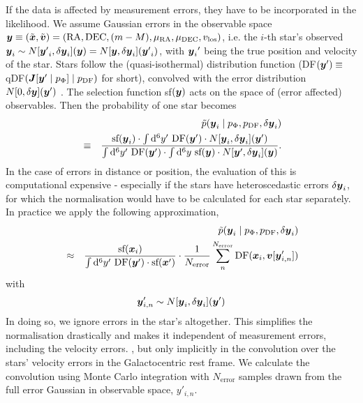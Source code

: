 
If the data is affected by measurement errors, they have to be incorporated in the likelihood. We assume Gaussian errors in the observable space $\boldsymbol{y} \equiv (\tilde{\boldsymbol{x}},\tilde{\boldsymbol{v}})=(\text{RA},\text{DEC},(m-M),\mu_\text{RA},\mu_\text{DEC},v_\text{los})$, i.e. the $i$-th star's observed $\boldsymbol{y}_i \sim N[{\boldsymbol{y}'}_i,\delta \boldsymbol{y}_i](\boldsymbol{y}) = N[\boldsymbol{y},\delta \boldsymbol{y}_i]({\boldsymbol{y}'}_i)$, with ${\boldsymbol{y}_i}'$ being the true position and velocity of the star. Stars follow the (quasi-isothermal) distribution function (DF$(\boldsymbol{y}') \equiv$ qDF$(\boldsymbol{J}[\boldsymbol{y}' \mid p_\Phi] \mid p_\text{DF})$ for short), convolved with the error distribution $N[0,\delta \boldsymbol{y}](\boldsymbol{y}')$ . The selection function sf$(\boldsymbol{y})$ acts on the space of (error affected) observables. 
Then the probability of one star becomes
\begin{eqnarray*}
&&\tilde{p}(\boldsymbol{y}_i \mid p_\Phi,p_\text{DF},\delta \boldsymbol{y}_i)\\
& \equiv& \frac{\text{sf}(\boldsymbol{y}_i) \cdot \int \mathop{}\!\mathrm{d^6} y' \  \text{DF}(\boldsymbol{y}') \cdot N[\boldsymbol{y}_i,\delta \boldsymbol{y}_i](\boldsymbol{y}')}{\int \mathop{}\!\mathrm{d^6}y'  \  \text{DF}(\boldsymbol{y}')  \cdot  \int \mathop{}\!\mathrm{d^6} y \  \text{sf}(\boldsymbol{y})  \cdot N[\boldsymbol{y}',\delta \boldsymbol{y}_i](\boldsymbol{y})}.
\end{eqnarray*}
In the case of errors in distance or position, the evaluation of this is computational expensive - especially if the stars have heteroscedastic errors $\delta \boldsymbol{y}_i$, for which the normalisation would have to be calculated for each star separately. In practice we apply the following approximation,
\begin{eqnarray}
&&\tilde{p}(\boldsymbol{y}_i \mid p_\Phi,p_\text{DF},\delta \boldsymbol{y}_i) \nonumber\\
&\approx& \frac{ \text{sf}(\boldsymbol{x}_i)}{\int \mathop{}\!\mathrm{d^6}y'  \  \text{DF}(\boldsymbol{y}')  \cdot   \text{sf}(\boldsymbol{x}')} \cdot \frac{1}{N_\text{error}} \sum_n^{N_\text{error}}  \text{DF}(\boldsymbol{x}_i,\boldsymbol{v}[\boldsymbol{y}'_{i,n}]) \label{eq:errorconv}
\end{eqnarray}
with
\begin{eqnarray}
\boldsymbol{y}'_{i,n} \sim N[\boldsymbol{y}_i,\delta \boldsymbol{y}_i](\boldsymbol{y}')\nonumber
\end{eqnarray}
In doing so, we ignore errors in the star's  altogether. This simplifies the normalisation drastically and makes it independent of measurement errors, including the velocity errors. , but only implicitly in the convolution over the stars' velocity errors in the Galactocentric rest frame. We calculate the convolution using Monte Carlo integration with $N_\text{error}$ samples drawn from the full error Gaussian in observable space, $y'_{i,n}$. \\
